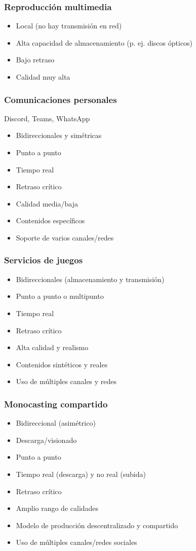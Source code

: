 \documentclass[11pt,a4paper]{article}
\begin{document}
\subsubsection*{Reproducción multimedia}
\begin{itemize}
  \item Local (no hay transmisión en red)
  \item Alta capacidad de almacenamiento (p. ej. discos ópticos)
  \item Bajo retraso
  \item Calidad muy alta
\end{itemize}

\subsubsection*{Comunicaciones personales}
Discord, Teams, WhatsApp
\begin{itemize}
  \item Bidireccionales y simétricas
  \item Punto a punto
  \item Tiempo real
  \item Retraso crítico
  \item Calidad media/baja
  \item Contenidos específicos
  \item Soporte de varios canales/redes
\end{itemize}

\subsubsection*{Servicios de juegos}
\begin{itemize}
  \item Bidireccionales (almacenamiento y transmisión)
  \item Punto a punto o multipunto
  \item Tiempo real
  \item Retraso crítico
  \item Alta calidad y realismo
  \item Contenidos sintéticos y reales
  \item Uso de múltiples canales y redes
\end{itemize}

\subsubsection*{Monocasting compartido}
\begin{itemize}
  \item Bidireccional (asimétrico)
  \item Descarga/visionado
  \item Punto a punto
  \item Tiempo real (descarga) y no real (subida)
  \item Retraso crítico
  \item Amplio rango de calidades
  \item Modelo de producción descentralizado y compartido
  \item Uso de múltiples canales/redes sociales
\end{itemize}
\end{document}
